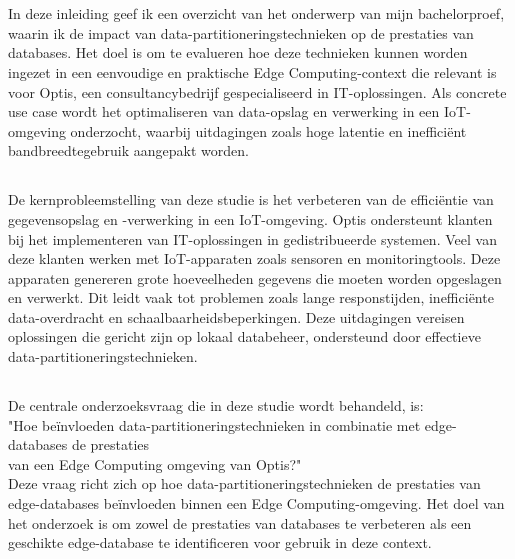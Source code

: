 
\chapter{}%
\label{ch:inleiding}

In deze inleiding geef ik een overzicht van het onderwerp van mijn bachelorproef, waarin ik de impact van data-partitioneringstechnieken op de prestaties van databases.
Het doel is om te evalueren hoe deze technieken kunnen worden ingezet in een eenvoudige en praktische Edge Computing-context die relevant is voor Optis, een consultancybedrijf gespecialiseerd in IT-oplossingen. Als concrete use case wordt het optimaliseren van data-opslag en verwerking in een IoT-omgeving onderzocht, waarbij uitdagingen zoals hoge latentie en inefficiënt bandbreedtegebruik aangepakt worden.

\section{}%
\label{sec:probleemstelling}

De kernprobleemstelling van deze studie is het verbeteren van de efficiëntie van gegevensopslag en -verwerking in een IoT-omgeving. 
Optis ondersteunt klanten bij het implementeren van IT-oplossingen in gedistribueerde systemen. Veel van deze klanten werken met IoT-apparaten zoals sensoren en monitoringtools. Deze apparaten genereren grote hoeveelheden gegevens die moeten worden opgeslagen en verwerkt. 
Dit leidt vaak tot problemen zoals lange responstijden, inefficiënte data-overdracht en schaalbaarheidsbeperkingen. Deze uitdagingen vereisen oplossingen die gericht zijn op lokaal databeheer, ondersteund door effectieve data-partitioneringstechnieken.

\section{}%
\label{sec:onderzoeksvraag}

De centrale onderzoeksvraag die in deze studie wordt behandeld, is: 
\\ "Hoe beïnvloeden data-partitioneringstechnieken in combinatie met edge-databases de prestaties \\ van een Edge Computing omgeving van Optis?" \\ 
  Deze vraag richt zich op hoe data-partitioneringstechnieken de prestaties van edge-databases beïnvloeden binnen een Edge Computing-omgeving. Het doel van het onderzoek is om zowel de prestaties van databases te verbeteren als een geschikte edge-database te identificeren voor gebruik in deze context.

